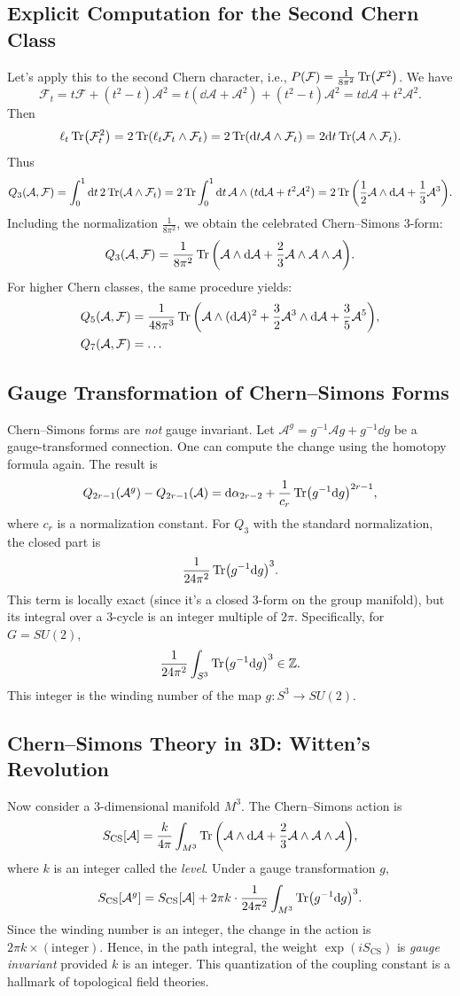 \documentclass[11pt]{article}
\newcommand{\cA}{\mathcal{A}}
\newcommand{\cF}{\mathcal{F}}
\newcommand{\Z}{\mathbb{Z}}
\begin{document}
\subsection{Explicit Computation for the Second Chern Class}
Let's apply this to the second Chern character, i.e., \(P(\cF) = \frac{1}{8\pi^2}\Tr(\cF^2)\). We have
\[
\cF_t = t\cF + (t^2-t)\cA^2 = t(\dd\cA + \cA^2) + (t^2-t)\cA^2 = t\dd\cA + t^2\cA^2.
\]
Then
\[
\ell_t \Tr(\cF_t^2) = 2\Tr(\ell_t\cF_t \wedge \cF_t) = 2\Tr(\dd t \cA \wedge \cF_t) = 2\dd t \Tr(\cA \wedge \cF_t).
\]
Thus
\[
Q_3(\cA,\cF) = \int_0^1 \dd t \, 2 \Tr(\cA \wedge \cF_t) 
= 2\Tr \int_0^1 \dd t \, \cA \wedge (t\dd\cA + t^2\cA^2)
= 2\Tr\qty(\frac{1}{2}\cA\wedge\dd\cA + \frac{1}{3}\cA^3).
\]
Including the normalization \(\frac{1}{8\pi^2}\), we obtain the celebrated Chern--Simons 3-form:
\[
Q_3(\cA,\cF) = \frac{1}{8\pi^2} \Tr\qty(\cA\wedge\dd\cA + \frac{2}{3}\cA\wedge\cA\wedge\cA).
\]
For higher Chern classes, the same procedure yields:
\begin{align*}
Q_5(\cA,\cF) &= \frac{1}{48\pi^3} \Tr\qty(\cA\wedge(\dd\cA)^2 + \frac{3}{2}\cA^3\wedge\dd\cA + \frac{3}{5}\cA^5), \\
Q_7(\cA,\cF) &= \dots
\end{align*}

\subsection{Gauge Transformation of Chern--Simons Forms}
Chern--Simons forms are \emph{not} gauge invariant. Let \(\cA^g = g^{-1}\cA g + g^{-1}\dd g\) be a gauge-transformed connection. One can compute the change using the homotopy formula again. The result is
\[
Q_{2r-1}(\cA^g) - Q_{2r-1}(\cA) = \dd\alpha_{2r-2} + \frac{1}{c_r} \Tr(g^{-1}\dd g)^{2r-1},
\]
where \(c_r\) is a normalization constant. For \(Q_3\) with the standard normalization, the closed part is
\[
\frac{1}{24\pi^2} \Tr(g^{-1}\dd g)^3.
\]
This term is locally exact (since it's a closed 3-form on the group manifold), but its integral over a 3-cycle is an integer multiple of \(2\pi\). Specifically, for \(G=SU(2)\),
\[
\frac{1}{24\pi^2} \int_{S^3} \Tr(g^{-1}\dd g)^3 \in \Z.
\]
This integer is the winding number of the map \(g: S^3 \to SU(2)\).

\subsection{Chern--Simons Theory in 3D: Witten's Revolution}
Now consider a 3-dimensional manifold \(M^3\). The Chern--Simons action is
\[
S_{\mathrm{CS}}[\cA] = \frac{k}{4\pi} \int_{M^3} \Tr\qty(\cA\wedge\dd\cA + \frac{2}{3}\cA\wedge\cA\wedge\cA),
\]
where \(k\) is an integer called the \emph{level}. Under a gauge transformation \(g\),
\[
S_{\mathrm{CS}}[\cA^g] = S_{\mathrm{CS}}[\cA] + 2\pi k \cdot \frac{1}{24\pi^2} \int_{M^3} \Tr(g^{-1}\dd g)^3.
\]
Since the winding number is an integer, the change in the action is \(2\pi k \times (\text{integer})\). Hence, in the path integral, the weight \(\exp(i S_{\mathrm{CS}})\) is \emph{gauge invariant} provided \(k\) is an integer. This quantization of the coupling constant is a hallmark of topological field theories.
\end{document}
